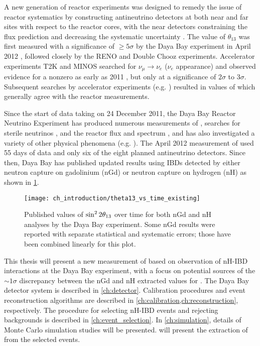 A new generation of reactor experiments
was designed to remedy the issue of reactor systematics
by constructing antineutrino detectors at both near and far sites
with respect to the reactor cores,
with the near detectors constraining the \nuebar{} flux prediction
and decreasing the systematic uncertainty \cite{near_far_proposal}.
The value of $\theta_{13}$ was first measured
with a significance of $\geq 5\sigma$
by the Daya Bay experiment in April 2012 \cite{ngd2012},
followed closely by the RENO \cite{reno2012}
and Double Chooz \cite{doublechooz2012} experiments.
Accelerator experiments T2K and MINOS
searched for $\nu_\mu\to\nu_e$ ($\nu_e$ appearance)
and observed evidence for a nonzero \thetaot{}
as early as 2011 \cite{t2k2011,minos2011},
but only at a significance of $2\sigma$ to $3\sigma$.
Subsequent searches by accelerator experiments (e.g. \cite{t2k2018})
resulted in values of \thetaot{} which generally agree
with the reactor measurements.

Since the start of data taking on 24 December 2011,
the Daya Bay Reactor Neutrino Experiment has produced numerous measurements of
\thetaot{}, searches for sterile neutrinos \cite{dyb_sterile2020},
and the reactor \nuebar{} flux and spectrum \cite{dyb_spec_decomp2019},
and has also investigated
a variety of other physical phenomena (e.g. \cite{dyb_cpt2018}).
The April 2012 measurement of \thetaot{} used 55 days of \nuebar{} data
and only six of the eight planned antineutrino detectors.
Since then, Daya Bay has published updated results using IBDs detected by
either neutron capture on gadolinium (nGd)
\cite{ngd2012,ngd2013,ngd2014,ngd2015,ngd2016,ngd2018}
or neutron capture on hydrogen (nH)
\cite{nh2014,nh2016}
as shown in \cref{fig:theta13_vs_t}.

\begin{figure}
    \centering
    \texttt{[image: ch\_introduction/theta13\_vs\_time\_existing]}
    \caption[Daya Bay \thetaot{} results over time]{
        Published values of $\sin^{2}2\theta_{13}$ over time
        for both nGd and nH analyses by the Daya Bay experiment.
        Some nGd results were reported with separate statistical
        and systematic errors;
        those have been combined linearly for this plot.
    }
    \label{fig:theta13_vs_t}
\end{figure}

This thesis will present a new measurement of \thetaot{}
based on observation of nH-IBD interactions
at the Daya Bay experiment,
with a focus on potential sources of the $\sim1\sigma$ discrepancy
between the nGd and nH extracted values for \thetaot{}.
The Daya Bay detector system is described in \cref{ch:detector}.
Calibration procedures and event reconstruction algorithms
are described in \cref{ch:calibration,ch:reconstruction}, respectively.
The procedure for selecting nH-IBD events and rejecting backgrounds
is described in \cref{ch:event_selection}.
In \cref{ch:simulation}, details of Monte Carlo simulation studies
will be presented.
 will present the extraction of \thetaot{}
from the selected events.
